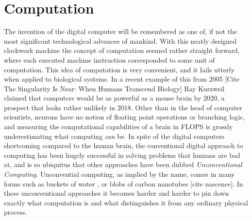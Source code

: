 \section{Computation}
The invention of the digital computer will be remembered as one of, if not the
most significant technological advances of mankind.
%
With this neatly designed clockwork machine the concept of computation seemed
rather straight forward, where each executed machine instruction corresponded to
some unit of computation.
%
This idea of computation is very convenient, and it fails utterly when
applied to biological systems.
In a recent example of this from 2005 [Cite The Singularity Is Near: When Humans
Transcend Biology] Ray Kurzweil claimed that computers would be as powerful as a
mouse brain by 2020, a prospect that looks rather unlikely in 2018.
Other than in the head of computer scientists, neurons have no notion of
floating point operations or branching logic, and measuring the computational
capabilities of a brain in FLOPS is grossly underestimating what computing
\emph{can} be.
%
In spite of the digital computers shortcoming compared to the human brain, the
conventional digital approach to computing has been hugely successful in solving
problems that humans are bad at, and is so ubiquitus that other approaches
have been dubbed \emph{Unconventional Computing}.
%
Unconvential computing, as implied by the name, comes in many forms such as
buckets of water \cite{fernando_pattern_2003}, or blobs of carbon nanotubes
[cite nascence]. 
%
In these unconventional approaches it becomes harder and harder to pin down
exactly what computation is and what distinguishes it from any ordinary physical
process.
%
\cleardoublepage

